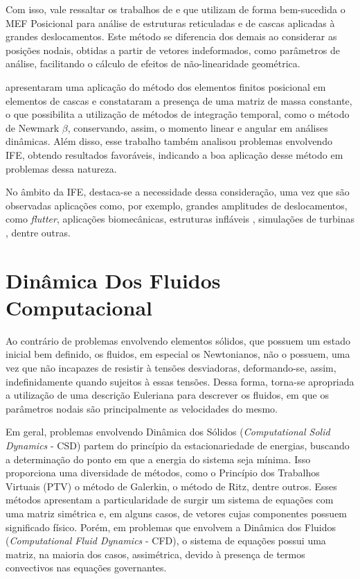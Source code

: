 \documentclass[_ArquivoPrincipal.tex]{subfiles}
\begin{document}
Com isso, vale ressaltar os trabalhos de  e  que utilizam de forma bem-sucedida o MEF Posicional para análise de estruturas reticuladas e de cascas aplicadas à grandes deslocamentos. Este método se diferencia dos demais ao considerar as posições nodais, obtidas a partir de vetores indeformados, como parâmetros de análise, facilitando o cálculo de efeitos de não-linearidade geométrica.

 apresentaram uma aplicação do método dos elementos finitos posicional em elementos de cascas e constataram a presença de uma matriz de massa constante, o que possibilita a utilização de métodos de integração temporal, como o método de Newmark $\beta$, conservando, assim, o momento linear e angular em análises dinâmicas. Além disso, esse trabalho também analisou problemas envolvendo IFE, obtendo resultados favoráveis, indicando a boa aplicação desse método em problemas dessa natureza.

No âmbito da IFE, destaca-se a necessidade dessa consideração, uma vez que são observadas aplicações como, por exemplo, grandes amplitudes de deslocamentos, como \textit{flutter}, aplicações biomecânicas, estruturas infláveis \cite{karagiozis2011computational}, simulações de turbinas \cite{bazilevs20113d}, dentre outras.

\section{Dinâmica Dos Fluidos Computacional} \label{CFD}

Ao contrário de problemas envolvendo elementos sólidos, que possuem um estado inicial bem definido, os fluidos, em especial os Newtonianos, não o possuem, uma vez que não incapazes de resistir à tensões desviadoras, deformando-se, assim, indefinidamente quando sujeitos à essas tensões. Dessa forma, torna-se apropriada a utilização de uma descrição Euleriana para descrever os fluidos, em que os parâmetros nodais são principalmente as velocidades do mesmo.

Em geral, problemas envolvendo Dinâmica dos Sólidos (\textit{Computational Solid Dynamics} - CSD) partem do princípio da estacionariedade de energias, buscando a determinação do ponto em que a energia do sistema seja mínima. Isso proporciona uma diversidade de métodos, como o Princípio dos Trabalhos Virtuais (PTV) o método de Galerkin, o método de Ritz, dentre outros. Esses métodos apresentam a particularidade de surgir um sistema de equações com uma matriz simétrica e, em alguns casos, de vetores cujas componentes possuem significado físico. Porém, em problemas que envolvem a Dinâmica dos Fluidos (\textit{Computational Fluid Dynamics} - CFD), o sistema de equações possui uma matriz, na maioria dos casos, assimétrica, devido à presença de termos convectivos nas equações governantes.
\end{document}
